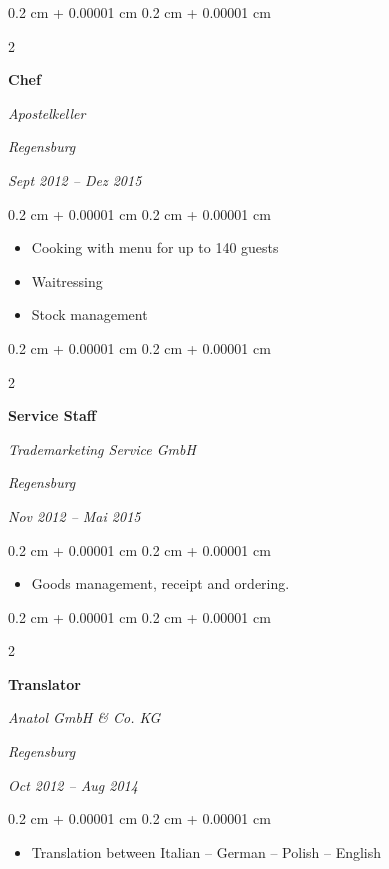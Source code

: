 \documentclass[10pt, letterpaper]{article}
\newenvironment{highlights}{
    \begin{itemize}[
        topsep=0.10 cm,
        parsep=0.10 cm,
        partopsep=0pt,
        itemsep=0pt,
        leftmargin=0.4 cm + 10pt
    ]
}{
    \end{itemize}
}
\newenvironment{onecolentry}{
    \begin{adjustwidth}{
        0.2 cm + 0.00001 cm
    }{
        0.2 cm + 0.00001 cm
    }
}{
    \end{adjustwidth}
}
\newenvironment{twocolentry}[2][]{
    \onecolentry
    \def\secondColumn{#2}
    \setcolumnwidth{\fill, 4.5 cm}
    \begin{paracol}{2}
}{
    \switchcolumn \raggedleft \secondColumn
    \end{paracol}
    \endonecolentry
}
\begin{document}
\begin{twocolentry}{
    \textit{Regensburg}    
    
    \textit{Sept 2012 – Dez 2015}}
    \textbf{Chef}
    
    \textit{Apostelkeller}
\end{twocolentry}

\vspace{0.10 cm}
\begin{onecolentry}
	\begin{highlights}
		\item Cooking with menu for up to 140 guests
        \item Waitressing
        \item Stock management
	\end{highlights}
\end{onecolentry}

\vspace{0.2 cm}
\begin{twocolentry}{
    \textit{Regensburg}    
    
    \textit{Nov 2012 – Mai 2015}}
    \textbf{Service Staff}
    
    \textit{Trademarketing Service GmbH}
\end{twocolentry}

\vspace{0.10 cm}
\begin{onecolentry}
	\begin{highlights}
		\item Goods management, receipt and ordering.
	\end{highlights}
\end{onecolentry}


\vspace{0.2 cm}
\begin{twocolentry}{
    \textit{Regensburg}    
    
    \textit{Oct 2012 – Aug 2014}}
    \textbf{Translator}
    
    \textit{Anatol GmbH \& Co. KG}
\end{twocolentry}

\vspace{0.10 cm}
\begin{onecolentry}
	\begin{highlights}
		\item Translation between Italian -- German -- Polish -- English
	\end{highlights}
\end{onecolentry}
\end{document}
